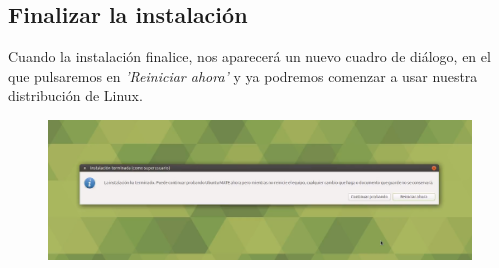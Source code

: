 \subsection{Finalizar la instalación}
Cuando la instalación finalice, nos aparecerá un nuevo cuadro de diálogo, en el que pulsaremos en \textit{'Reiniciar ahora'} y ya podremos comenzar a usar nuestra distribución de Linux.
\begin{figure}[H]
        \centering
        \includegraphics[width= 0.7 \textwidth]{Media/umate7.png}
\end{figure}

